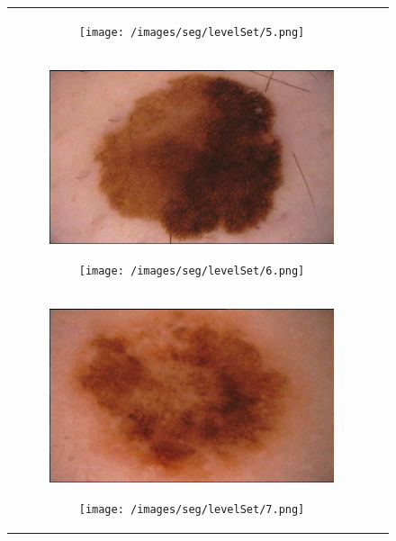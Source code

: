 \documentclass[a4paper, 10pt, conference]{ieeeconf}        %
\begin{document}
\begin{figure}[ht!]
\begin{tabular}{c c}
\begin{subfigure}{0.2\textwidth}
  \end{subfigure}
  \begin{subfigure}{0.2\textwidth}
  \texttt{[image: /images/seg/levelSet/5.png]}
  \caption{}
  \end{subfigure}\\
  \begin{subfigure}{0.2\textwidth}
   \includegraphics[scale=0.15]{original06.JPG}\caption{}
   \end{subfigure}
   \begin{subfigure}{0.2\textwidth}
   \texttt{[image: /images/seg/levelSet/6.png]}
   \caption{}
   \end{subfigure}\\
  \begin{subfigure}{0.2\textwidth}
   \includegraphics[scale=0.15]{original07.JPG}\caption{}
   \end{subfigure}
   \begin{subfigure}{0.2\textwidth}
   \texttt{[image: /images/seg/levelSet/7.png]}
   \caption{}

\end{subfigure}
\end{tabular}
\end{figure}
\end{document}
